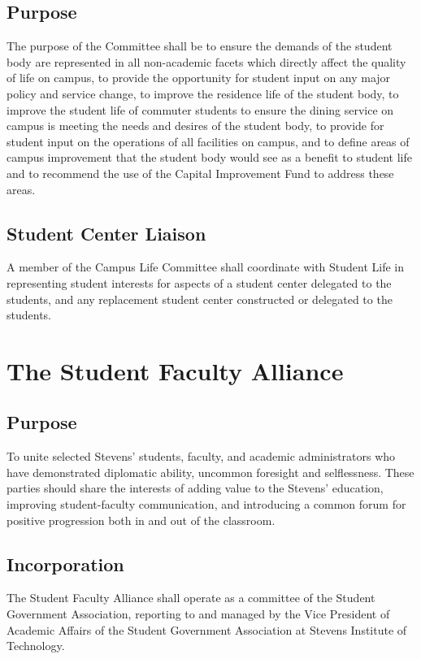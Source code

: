 \documentclass[12pt]{scrreprt}
\begin{document}
\subsection{Purpose}
The purpose of the Committee shall be to ensure the demands of the student 
body are represented in all non-academic facets which directly affect the 
quality of life on campus, to provide the opportunity for student input on any 
major policy and service change, to improve the residence life of the student 
body, to improve the student life of commuter students to ensure the dining 
service on campus is meeting the needs and desires of the student body, to 
provide for student input on the operations of all facilities on campus, and 
to define areas of campus improvement that the student body would see as a 
benefit to student life and to recommend the use of the Capital Improvement 
Fund to address these areas.

\subsection{Student Center Liaison}
A member of the Campus Life Committee shall coordinate with Student Life in 
representing student interests for aspects of a student center delegated to 
the students, and any replacement student center constructed or delegated to 
the students.

\section{The Student Faculty Alliance}

\subsection{Purpose}
To unite selected Stevens’ students, faculty, and academic administrators who have
demonstrated diplomatic ability, uncommon foresight and selflessness. These parties
should share the interests of adding value to the Stevens’ education, improving student-faculty
communication, and introducing a common forum for positive progression both
in and out of the classroom.

\subsection{Incorporation}
The Student Faculty Alliance shall operate as a committee of the Student Government
Association, reporting to and managed by the Vice President of Academic Affairs of the
Student Government Association at Stevens Institute of Technology.
\end{document}
